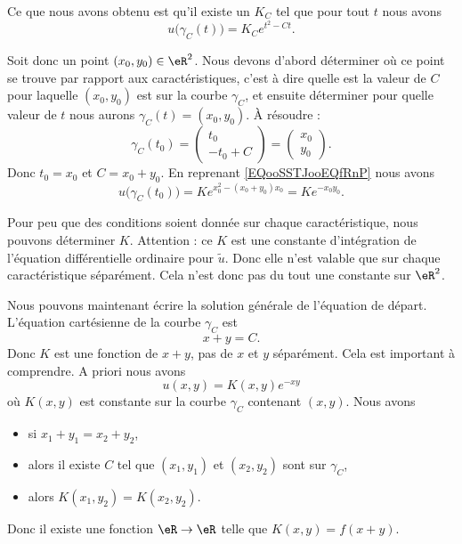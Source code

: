 Ce que nous avons obtenu est qu'il existe un \( K_C\) tel que pour tout \( t\) nous avons
\begin{equation}
    u\big( \gamma_C(t) \big)=K_C e^{t^2-Ct}.
\end{equation}

Soit donc un point \( (x_0,y_0)\in \eR^2\). Nous devons d'abord déterminer où ce point se trouve par rapport aux caractéristiques, c'est à dire quelle est la valeur de \( C\) pour laquelle \( (x_0,y_0)\) est sur la courbe \( \gamma_C\), et ensuite déterminer pour quelle valeur de \( t\) nous aurons \( \gamma_C(t)=(x_0,y_0)\). À résoudre :
\begin{equation}
    \gamma_C(t_0)=\begin{pmatrix}
        t_0    \\ 
        -t_0+C    
    \end{pmatrix}=\begin{pmatrix}
        x_0    \\ 
        y_0    
    \end{pmatrix}.
\end{equation}
Donc \( t_0=x_0\) et \( C=x_0+y_0\). En reprenant \eqref{EQooSSTJooEQfRnP} nous avons
\begin{equation}
    u\big( \gamma_C(t_0) \big)=K e^{x_0^2-(x_0+y_0)x_0}=K e^{-x_0y_0}.
\end{equation}

Pour peu que des conditions soient donnée sur chaque caractéristique, nous pouvons déterminer \( K\). Attention : ce \( K\) est une constante d'intégration de l'équation différentielle ordinaire pour \( \tilde u\). Donc elle n'est valable que sur chaque caractéristique séparément. Cela n'est donc pas du tout une constante sur \( \eR^2\).

Nous pouvons maintenant écrire la solution générale de l'équation de départ. L'équation cartésienne de la courbe \( \gamma_C\) est
\begin{equation}
    x+y=C.
\end{equation}
Donc \( K\) est une fonction de \( x+y\), pas de \( x\) et \( y\) séparément. Cela est important à comprendre. A priori nous avons
\begin{equation}
    u(x,y)=K(x,y) e^{-xy}
\end{equation}
où \( K(x,y)\) est constante sur la courbe \( \gamma_C\) contenant \( (x,y)\). Nous avons 
\begin{itemize}
    \item si \( x_1+y_1=x_2+y_2\),
    \item alors il existe \( C\) tel que \( (x_1,y_1)\) et \( (x_2,y_2)\) sont sur \( \gamma_C\),
    \item alors \( K(x_1,y_2)=K(x_2,y_2)\).
\end{itemize}
Donc il existe une fonction \( \eR\to \eR\) telle que \( K(x,y)=f(x+y)\). 

